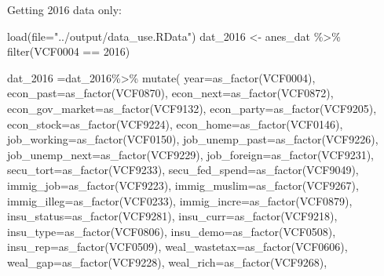 \documentclass[
]{article}
\newenvironment{Shaded}{\begin{snugshade}}{\end{snugshade}}
\newcommand{\AttributeTok}[1]{\textcolor[rgb]{0.77,0.63,0.00}{#1}}
\newcommand{\DecValTok}[1]{\textcolor[rgb]{0.00,0.00,0.81}{#1}}
\newcommand{\FunctionTok}[1]{\textcolor[rgb]{0.00,0.00,0.00}{#1}}
\newcommand{\NormalTok}[1]{#1}
\newcommand{\OtherTok}[1]{\textcolor[rgb]{0.56,0.35,0.01}{#1}}
\newcommand{\SpecialCharTok}[1]{\textcolor[rgb]{0.00,0.00,0.00}{#1}}
\newcommand{\StringTok}[1]{\textcolor[rgb]{0.31,0.60,0.02}{#1}}
\begin{document}
Getting 2016 data only:

\begin{Shaded}
\begin{Highlighting}[]
\FunctionTok{load}\NormalTok{(}\AttributeTok{file=}\StringTok{"../output/data\_use.RData"}\NormalTok{)}
\NormalTok{dat\_2016 }\OtherTok{\textless{}{-}}\NormalTok{ anes\_dat }\SpecialCharTok{\%\textgreater{}\%} \FunctionTok{filter}\NormalTok{(VCF0004 }\SpecialCharTok{==} \DecValTok{2016}\NormalTok{)}

\NormalTok{dat\_2016 }\OtherTok{=}\NormalTok{dat\_2016}\SpecialCharTok{\%\textgreater{}\%}
  \FunctionTok{mutate}\NormalTok{(}
    \AttributeTok{year=}\FunctionTok{as\_factor}\NormalTok{(VCF0004),}
    \AttributeTok{econ\_past=}\FunctionTok{as\_factor}\NormalTok{(VCF0870),}
    \AttributeTok{econ\_next=}\FunctionTok{as\_factor}\NormalTok{(VCF0872),}
    \AttributeTok{econ\_gov\_market=}\FunctionTok{as\_factor}\NormalTok{(VCF9132),}
    \AttributeTok{econ\_party=}\FunctionTok{as\_factor}\NormalTok{(VCF9205),}
    \AttributeTok{econ\_stock=}\FunctionTok{as\_factor}\NormalTok{(VCF9224),}
    \AttributeTok{econ\_home=}\FunctionTok{as\_factor}\NormalTok{(VCF0146),}
    \AttributeTok{job\_working=}\FunctionTok{as\_factor}\NormalTok{(VCF0150),}
    \AttributeTok{job\_unemp\_past=}\FunctionTok{as\_factor}\NormalTok{(VCF9226),}
    \AttributeTok{job\_unemp\_next=}\FunctionTok{as\_factor}\NormalTok{(VCF9229),}
    \AttributeTok{job\_foreign=}\FunctionTok{as\_factor}\NormalTok{(VCF9231),}
    \AttributeTok{secu\_tort=}\FunctionTok{as\_factor}\NormalTok{(VCF9233),}
    \AttributeTok{secu\_fed\_spend=}\FunctionTok{as\_factor}\NormalTok{(VCF9049),}
    \AttributeTok{immig\_job=}\FunctionTok{as\_factor}\NormalTok{(VCF9223),}
    \AttributeTok{immig\_muslim=}\FunctionTok{as\_factor}\NormalTok{(VCF9267),}
    \AttributeTok{immig\_illeg=}\FunctionTok{as\_factor}\NormalTok{(VCF0233),}
    \AttributeTok{immig\_incre=}\FunctionTok{as\_factor}\NormalTok{(VCF0879),}
    \AttributeTok{insu\_status=}\FunctionTok{as\_factor}\NormalTok{(VCF9281),}
    \AttributeTok{insu\_curr=}\FunctionTok{as\_factor}\NormalTok{(VCF9218),}
    \AttributeTok{insu\_type=}\FunctionTok{as\_factor}\NormalTok{(VCF0806),}
    \AttributeTok{insu\_demo=}\FunctionTok{as\_factor}\NormalTok{(VCF0508),}
    \AttributeTok{insu\_rep=}\FunctionTok{as\_factor}\NormalTok{(VCF0509),}
    \AttributeTok{weal\_wastetax=}\FunctionTok{as\_factor}\NormalTok{(VCF0606),}
    \AttributeTok{weal\_gap=}\FunctionTok{as\_factor}\NormalTok{(VCF9228),}
    \AttributeTok{weal\_rich=}\FunctionTok{as\_factor}\NormalTok{(VCF9268),}

\end{Highlighting}
\end{Shaded}
\end{document}

